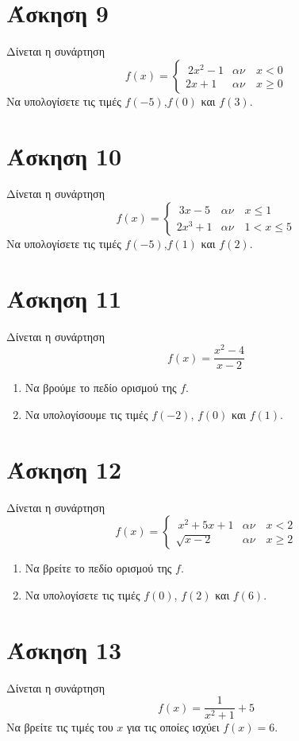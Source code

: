 \documentclass[a4paper,10pt]{report}
\begin{document}
\section*{Άσκηση 9  \hfill \small{}}
Δίνεται η συνάρτηση 
$$ f(x)=\begin{cases} 
                \ 2x^{2}-1   & αν\quad x< 0 \\
                  2x+1     & αν\quad x\ge 0
               \end{cases} $$
Να υπολογίσετε τις τιμές $f(-5)$,$f(0)$ και $f(3)$.

\section*{Άσκηση 10  \hfill \small{}}
Δίνεται η συνάρτηση 
$$ f(x)=\begin{cases} 
                \ 3x-5   & αν\quad x\le 1 \\
                  2x^{3}+1     & αν\quad 1<x\le 5
               \end{cases} $$
Να υπολογίσετε τις τιμές $f(-5)$,$f(1)$ και $f(2)$.

\section*{Άσκηση 11  \hfill \small{}}
Δίνεται η συνάρτηση 
$$ f(x)=\dfrac{x^{2}-4}{x-2} $$
\begin{enumerate}[1)]
\item Να βρούμε το πεδίο ορισμού της $f$.
\item Να υπολογίσουμε τις τιμές $f(-2)$, $f(0)$ και $f(1)$.
\end{enumerate}

\section*{Άσκηση 12  \hfill \small{}}
Δίνεται η συνάρτηση 
$$ f(x)=\begin{cases} 
                \ x^{2}+5x+1   & αν\quad x< 2 \\
                  \sqrt{x-2}     & αν\quad x\ge 2
               \end{cases} $$
\begin{enumerate}[1)]
\item Να βρείτε το πεδίο ορισμού της $f$.
\item Να υπολογίσετε τις τιμές $f(0)$, $f(2)$ και $f(6)$.
\end{enumerate}

\section*{Άσκηση 13  \hfill \small{}}
Δίνεται η συνάρτηση 
$$ f(x)=\dfrac{1}{x^{2}+1}+5 $$
Να βρείτε τις τιμές του $x$ για  τις οποίες ισχύει $f(x)=6$.
\end{document}

